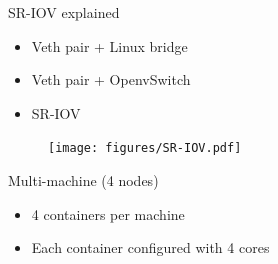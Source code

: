 \documentclass[11pt,xcolor=dvipsnames,presentation]{beamer}
\begin{document}
\begin{frame}[label=sec-4-0-8]{SR-IOV explained}
\begin{itemize}
\item \alert{Veth pair + Linux bridge}
\item \alert{Veth pair + OpenvSwitch}
\item \alert{SR-IOV}
\end{itemize}

\begin{figure}[!h]
  \center
  \texttt{[image: figures/SR-IOV.pdf]}
\end{figure}
\end{frame}

\begin{frame}[label=sec-4-0-9]{Multi-machine (4 nodes)}
\begin{itemize}
\item 4 containers per machine
\item Each container configured with 4 cores
\end{itemize}


\end{frame}
\end{document}
